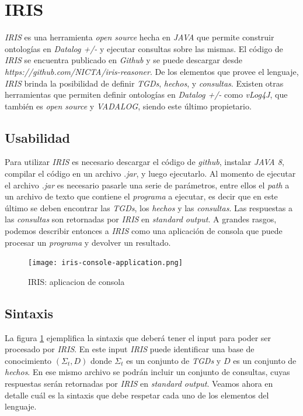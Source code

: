 \documentclass[11pt,a4paper,twoside]{tesis}
\begin{document}
\section{IRIS}

\textit{IRIS} es una herramienta \textit{open source} hecha en \textit{JAVA} que permite construir ontologías en \textit{Datalog +/-} y ejecutar consultas sobre las mismas. El código de \textit{IRIS} se encuentra publicado en \textit{Github} y se puede descargar desde \textit{https://github.com/NICTA/iris-reasoner}. De los elementos que provee el lenguaje, \textit{IRIS} brinda la posibilidad de definir \textit{TGDs}, \textit{hechos}, y \textit{consultas}. Existen otras herramientas que permiten definir ontologías en \textit{Datalog +/-} como \textit{vLog4J}, que también es \textit{open source} y \textit{VADALOG}, siendo este último propietario.

\subsection{Usabilidad}
Para utilizar \textit{IRIS} es necesario descargar el código de \textit{github}, instalar \textit{JAVA 8}, compilar el código en un archivo \textit{.jar}, y luego ejecutarlo. Al momento de ejecutar el archivo \textit{.jar} es necesario pasarle una serie de parámetros, entre ellos el \textit{path} a un archivo de texto que contiene el \textit{programa} a ejecutar, es decir que en este último se deben encontrar las \textit{TGDs}, los \textit{hechos} y las \textit{consultas}. Las respuestas a las \textit{consultas} son retornadas por \textit{IRIS} en \textit{standard output}. A grandes rasgos, podemos describir entonces a \textit{IRIS} como una aplicación de consola que puede procesar un \textit{programa} y devolver un resultado.

\begin{figure}[ht]
    \texttt{[image: iris-console-application.png]}
    \centering
    \caption{IRIS: aplicacion de consola}
    \label{fig:iris_console_application}
\end{figure}


\subsection{Sintaxis}\label{section_sintaxis}
La figura \ref{fig:iris_console_application} ejemplifica la sintaxis que deberá tener el input para poder ser procesado por \textit{IRIS}. En este input \textit{IRIS} puede identificar una base de conocimiento $(\Sigma_t, D)$ donde $\Sigma_t$ es un conjunto de \textit{TGDs} y $D$ es un conjunto de \textit{hechos}. En ese mismo archivo se podrán incluir un conjunto de consultas, cuyas respuestas serán retornadas por \textit{IRIS} en \textit{standard output}. Veamos ahora en detalle cuál es la sintaxis que debe respetar cada uno de los elementos del lenguaje.
\end{document}
